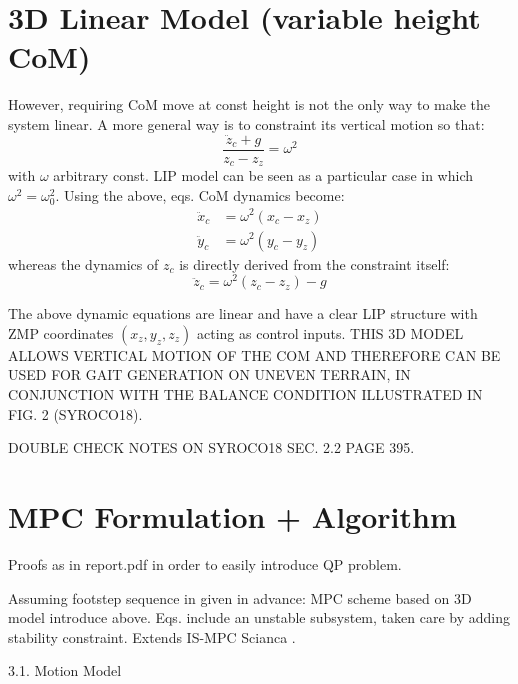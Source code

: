 \section{3D Linear Model (variable height CoM)}

However, requiring CoM move at const height is not the only way to make the 
system linear. A more general way is to constraint its vertical motion so that:
\begin{equation}
  \frac{\ddot{z}_c + g}{z_c - z_z} = \omega^2
\end{equation}
with $\omega$ arbitrary const. LIP model can be seen as a particular case in
which $\omega^2 = \omega_0^2$. Using the above, eqs. CoM dynamics become:
\begin{align}
  \ddot{x}_c &= \omega^2 (x_c - x_z) \\
  \ddot{y}_c &= \omega^2 (y_c - y_z)
\end{align}
whereas the dynamics of $z_c$ is directly derived from the constraint itself:
\begin{equation}
  \ddot{z}_c = \omega^2 (z_c - z_z) - g
\end{equation}

The above dynamic equations are linear and have a clear LIP structure with 
ZMP coordinates $(x_z, y_z, z_z)$ acting as control inputs. THIS 3D MODEL 
ALLOWS VERTICAL MOTION OF THE COM AND THEREFORE CAN BE USED FOR GAIT GENERATION 
ON UNEVEN TERRAIN, IN CONJUNCTION WITH THE BALANCE CONDITION ILLUSTRATED IN 
FIG. 2 (SYROCO18).

DOUBLE CHECK NOTES ON SYROCO18 SEC. 2.2 PAGE 395.

\section{MPC Formulation + Algorithm}
Proofs as in report.pdf in order to easily introduce QP problem.

Assuming footstep sequence in given in advance: MPC scheme based on 3D model 
introduce above. Eqs. include an unstable subsystem, taken care by adding
stability constraint. Extends IS-MPC Scianca
\cite{DBLP:conf/humanoids/SciancaCSLO16}.

3.1. Motion Model

